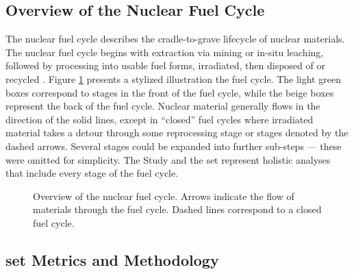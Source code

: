 \subsection{Overview of the Nuclear Fuel Cycle}

The nuclear fuel cycle describes the cradle-to-grave lifecycle of nuclear materials. The nuclear fuel cycle begins with extraction via 
mining or in-situ leaching, followed by processing into usable fuel forms, irradiated, then disposed of or recycled \cite{tsoulfanidis_review_2013}. 
Figure \ref{fig:nuclear-fuel-cycle} presents a stylized illustration the fuel cycle. The light green boxes correspond to stages in the front of the fuel cycle, 
while the beige boxes represent the back of the fuel cycle. Nuclear material generally flows in the direction of the solid lines, except in ``closed'' fuel cycles 
where irradiated material takes a detour through some reprocessing stage or stages denoted by the dashed arrows. Several stages could be expanded into further 
sub-steps --- these were omitted for simplicity. The Study and the \ac{set} represent holistic analyses that include every stage of the fuel cycle.

\begin{figure}[htbp!]
  \centering
  \resizebox{\columnwidth}{!}{}
  \caption{Overview of the nuclear fuel cycle. Arrows indicate the flow of materials through the fuel cycle. 
  Dashed lines correspond to a closed fuel cycle.}
  \label{fig:nuclear-fuel-cycle}
\end{figure}

\subsection{\ac{set} Metrics and Methodology}

